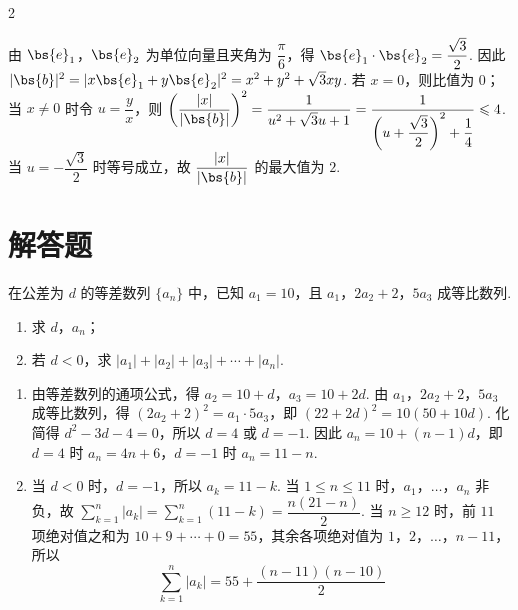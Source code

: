 \begin{answer}
2
\end{answer}

\begin{solution}
由 \(\bs{e}_{1}\)，\(\bs{e}_{2}\) 为单位向量且夹角为 \(\dfrac{\pi}{6}\)，得 \(\bs{e}_{1}\cdot\bs{e}_{2}=\dfrac{\sqrt3}{2}\). 因此 \(|\bs{b}|^{2}=|x\bs{e}_{1}+y\bs{e}_{2}|^{2}=x^{2}+y^{2}+\sqrt3xy\). 若 \(x=0\)，则比值为 \(0\)；当 \(x\ne0\) 时令 \(u=\dfrac{y}{x}\)，则 \(\left(\dfrac{|x|}{|\bs{b}|}\right)^{2}=\dfrac{1}{u^{2}+\sqrt3u+1}=\dfrac{1}{\left(u+\dfrac{\sqrt3}{2}\right)^{2}+\dfrac14}\leqslant4\). 当 \(u=-\dfrac{\sqrt3}{2}\) 时等号成立，故 \(\dfrac{|x|}{|\bs{b}|}\) 的最大值为 \(2\).
\end{solution}

\section{解答题}

\begin{problem}
在公差为 \(d\) 的等差数列 \(\{a_{n}\}\) 中，已知 \(a_{1} = 10\)，且 \(a_{1}\)，\(2a_{2} + 2\)，\(5a_{3}\) 成等比数列.

\begin{enumerate}
\item 求 \(d\)，\(a_{n}\)；
\item 若 \(d < 0\)，求 \(\left|a_{1}\right| + \left|a_{2}\right| + \left|a_{3}\right| + \cdots + \left|a_{n}\right|\).
\end{enumerate}
\end{problem}

\begin{solution}
\begin{enumerate}
\item 由等差数列的通项公式，得 \(a_{2}=10+d\)，\(a_{3}=10+2d\). 由 \(a_{1}\)，\(2a_{2}+2\)，\(5a_{3}\) 成等比数列，得
\((2a_{2}+2)^{2}=a_{1}\cdot5a_{3}\)，即 \((22+2d)^{2}=10(50+10d)\). 化简得 \(d^{2}-3d-4=0\)，所以 \(d=4\) 或 \(d=-1\). 因此 \(a_{n}=10+(n-1)d\)，即 \(d=4\) 时 \(a_{n}=4n+6\)，\(d=-1\) 时 \(a_{n}=11-n\).

\item 当 \(d<0\) 时，\(d=-1\)，所以 \(a_{k}=11-k\). 当 \(1\leqslant n\leqslant11\) 时，\(a_{1}\)，\(\ldots\)，\(a_{n}\) 非负，故
\(\displaystyle\sum_{k=1}^{n}|a_{k}|=\sum_{k=1}^{n}(11-k)=\dfrac{n(21-n)}{2}\). 当 \(n\geqslant12\) 时，前 \(11\) 项绝对值之和为 \(10+9+\cdots+0=55\)，其余各项绝对值为 \(1\)，\(2\)，\(\ldots\)，\(n-11\)，所以
\[
\sum_{k=1}^{n}|a_{k}|=55+\frac{(n-11)(n-10)}{2}
\]
\end{enumerate}
\end{solution}

